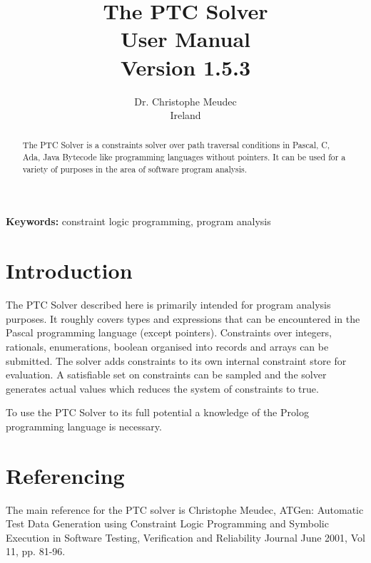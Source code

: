 \documentclass{article}
\begin{document}
\title{The PTC Solver\\
       User Manual\\
       Version 1.5.3}
\author{Dr. Christophe Meudec \\
        Ireland}
\maketitle

\begin{abstract}
The PTC Solver is a constraints solver over path traversal conditions in Pascal,
C, Ada, Java Bytecode like programming languages without pointers. It
can be used for a variety of purposes in the area of software program analysis.
\end{abstract}


\noindent\textbf{Keywords:} constraint logic programming, program analysis

\section{Introduction}

The PTC Solver described here is primarily intended for program analysis
purposes.
It roughly covers types and expressions that can be encountered in the Pascal
programming language (except pointers). Constraints over integers, rationals,
enumerations, boolean organised into records and arrays can be submitted. The
solver adds constraints to its own internal constraint store for evaluation. A
satisfiable set on constraints can be sampled and the solver generates actual
values which reduces the system of constraints to true.

To use the PTC Solver to its full potential a knowledge of
the Prolog programming language is necessary.

\section{Referencing}

The main reference for the PTC solver is Christophe Meudec,
ATGen: Automatic Test Data Generation using Constraint Logic Programming and
Symbolic Execution
in Software Testing, Verification and Reliability Journal
June 2001, Vol 11, pp. 81-96.

\end{document}
